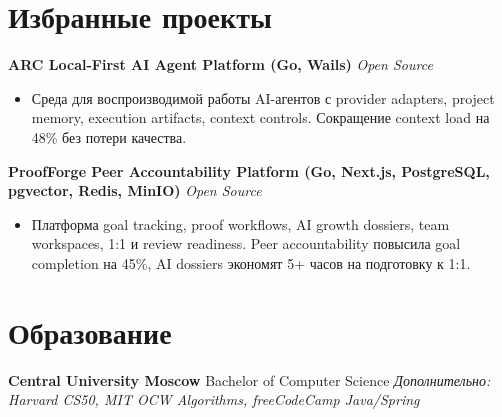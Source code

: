 \documentclass[10pt,a4paper]{article}
\begin{document}
\section*{Избранные проекты}
\textbf{ARC \textbar{} Local-First AI Agent Platform (Go, Wails)} \hfill \textit{Open Source}
\begin{itemize}
  \item Среда для воспроизводимой работы AI-агентов с provider adapters, project memory, execution artifacts, context controls. Сокращение context load на 48\% без потери качества.
\end{itemize}
\textbf{ProofForge \textbar{} Peer Accountability Platform (Go, Next.js, PostgreSQL, pgvector, Redis, MinIO)} \hfill \textit{Open Source}
\begin{itemize}
  \item Платформа goal tracking, proof workflows, AI growth dossiers, team workspaces, 1:1 и review readiness. Peer accountability повысила goal completion на 45\%, AI dossiers экономят 5+ часов на подготовку к 1:1.
\end{itemize}

\section*{Образование}
\textbf{Central University Moscow} \textbar{} Bachelor of Computer Science \hfill \textit{Дополнительно: Harvard CS50, MIT OCW Algorithms, freeCodeCamp Java/Spring}
\end{document}
